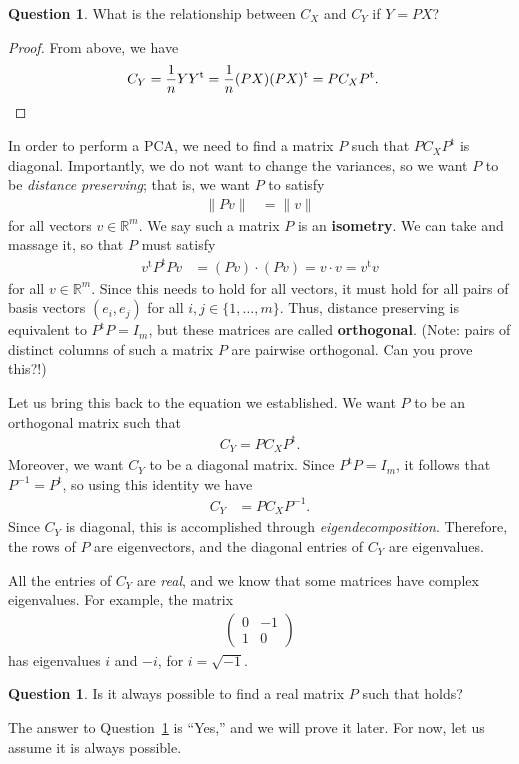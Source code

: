 \documentclass[a4paper, 12pt]{article}
\numberwithin{equation}{section}
\numberwithin{figure}{section}
\theoremstyle{definition}
\newtheorem{quest}[thm]{Question}
\newcommand{\R}{\mathbb{R}}
\newcommand{\tr}{\mathrm{t}}
\begin{document}
\begin{quest} 
	What is the relationship between $C_X$ and $C_Y$ if $Y = PX$? 
\end{quest}

\begin{proof}
	From above, we have
	\begin{align*}
		C_Y &= \dfrac{1}{n} YY^{\tr} = \dfrac{1}{n} (PX)(PX)^{\tr} = P C_X P^{\tr}. \qedhere
	\end{align*}
\end{proof}

In order to perform a PCA, we need to find a matrix $P$ such that $PC_XP^{\tr}$
is diagonal. Importantly, we do not want to change the variances, so we want $P$
to be \textit{distance preserving}; that is, we want $P$ to satisfy
\begin{align}\label{eqn:dist-preserve}
	\| Pv \| &= \| v\|
\end{align}
for all vectors $v\in\R^m$. We say such a matrix $P$ is an \textbf{isometry}. We
can take  and massage it, so that $P$ must satisfy 
\begin{align*}
	v^{\tr} P^{\tr} P v &= (Pv)\cdot (Pv) = v\cdot v = v^{\tr} v
\end{align*}
for all $v\in \R^m$. Since this needs to hold for all vectors, it must hold for
all pairs of basis vectors $(e_i,e_j)$ for all $i,j\in\{1,\dots, m\}$. Thus,
distance preserving is equivalent to $P^{\tr}P = I_m$, but these matrices are
called \textbf{orthogonal}. (Note: pairs of distinct columns of such a matrix
$P$ are pairwise orthogonal. Can you prove this?!) 


Let us bring this back to the equation we established. We want $P$ to be an
orthogonal matrix such that 
\begin{align}\label{eqn:CY-CX}
	C_Y = PC_XP^{\tr} .
\end{align} 
Moreover, we want $C_Y$ to be a diagonal matrix. Since $P^{\tr}P=I_m$, it
follows that $P^{-1} = P^{\tr}$, so using this identity we have 
\begin{align*}
	C_Y &= PC_XP^{-1}.
\end{align*}
Since $C_Y$ is diagonal, this is accomplished through
\textit{eigendecomposition}. Therefore, the rows of $P$ are eigenvectors, and
the diagonal entries of $C_Y$ are eigenvalues.

All the entries of $C_Y$ are \textit{real}, and we know that some matrices have
complex eigenvalues. For example, the matrix 
\begin{align*}
	\begin{pmatrix}
		0 & -1 \\ 1 & 0 
	\end{pmatrix}
\end{align*}
has eigenvalues $i$ and $-i$, for $i=\sqrt{-1}$. 
\begin{quest}\label{quest:PCA-possible}
	Is it always possible to find a real matrix $P$ such that 
	holds?
\end{quest}
The answer to Question~\ref{quest:PCA-possible} is ``Yes,'' and we will prove it later.
For now, let us assume it is always possible. 
\end{document}
